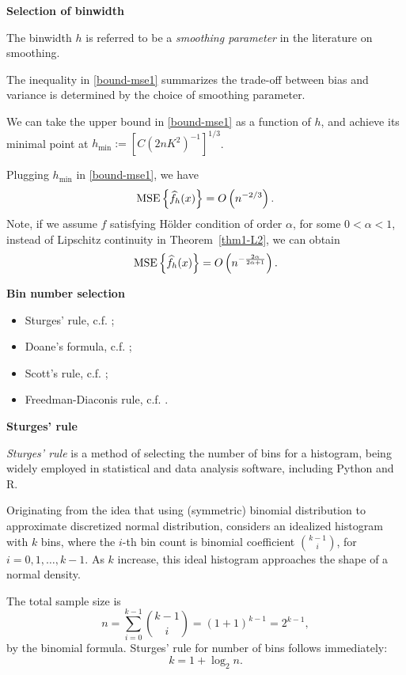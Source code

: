 \documentclass[19pt,landscape]{article}
\begin{document}
\newpage
{\LARGE\centerline{\textbf{Selection of binwidth}}}
\vskip25pt
\begin{minipage}{.9\textwidth}
    \Large The binwidth $h$ is referred to be a {\it smoothing parameter} in the literature on smoothing. 

    The inequality in \eqref{bound-mse1} summarizes the trade-off between bias and variance is determined by the choice of smoothing parameter. 

    We can take the upper bound in \eqref{bound-mse1} as a function of $h$, and achieve its minimal point at $h_{\min}:=[C(2nK^2)^{-1}]^{1/3}$. 
    
    Plugging $h_{\min}$ in \eqref{bound-mse1}, we have
    $${\rm MSE}\left\{\widehat{f}_h(x)\right\}=O\left(n^{-2/3}\right).$$
    Note, if we assume $f$ satisfying H\"older condition of order $\alpha$, for some $0<\alpha<1$, instead of Lipschitz continuity in Theorem~\ref{thm1-L2}, we can obtain 
    $${\rm MSE}\left\{\widehat{f}_h(x)\right\}=O\left(n^{-\frac{2\alpha}{2\alpha+1}}\right).$$
\end{minipage}

\newpage
{\LARGE\centerline{\textbf{Bin number selection}}}
\vskip25pt
\begin{minipage}{.9\textwidth}
    \Large 
\begin{itemize}
    \item Sturges' rule, c.f. \cite{sturges26};
    \item Doane's formula, c.f. \cite{doane76};
    \item Scott's rule, c.f. \cite{scott79};
    \item Freedman-Diaconis rule, c.f. \cite{FreedmanDiaconis81}. 
\end{itemize}
\end{minipage}

\newpage
{\LARGE{\textbf{Sturges' rule}}}
\vskip25pt
\begin{minipage}{.9\textwidth}
    \Large 
{\it Sturges' rule} is a method of selecting the number of bins for a histogram, being widely employed in statistical and data analysis software, including Python and R. 

Originating from the idea that using (symmetric) binomial distribution to approximate discretized normal distribution, \cite{sturges26} considers an idealized histogram with $k$ bins, where the $i$-th bin count is binomial coefficient ${k-1 \choose i}$, for $i=0,1,\dots,k-1$. As $k$ increase, this ideal histogram approaches the shape of a normal density. 

The total sample size is 
$$n=\sum_{i=0}^{k-1}{k-1 \choose i}=(1+1)^{k-1}=2^{k-1},$$
by the binomial formula. Sturges' rule for number of bins follows immediately:
\begin{equation}\label{sturges-rule}
    k=1+\log_2n.
\end{equation}
\end{minipage}
\end{document}
